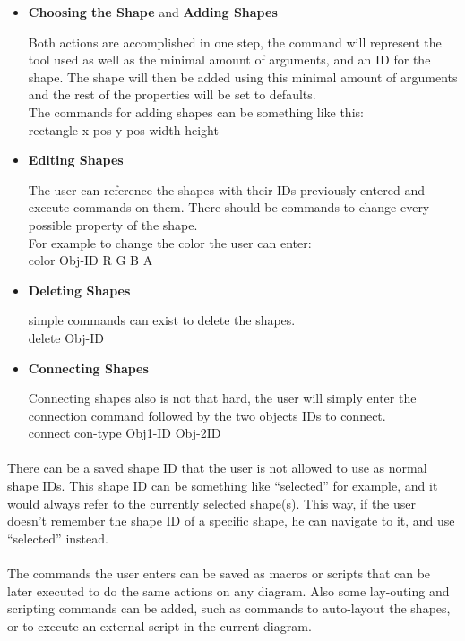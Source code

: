 \begin{itemize}
\item {{\bf Choosing the Shape} and {\bf Adding Shapes}}
\par \noindent
Both actions are accomplished in one step, the command will represent the tool used as well as the minimal amount of arguments, and an ID for the shape. The shape will then be added using this minimal amount of arguments and the rest of the properties will be set to defaults.\\
The commands for adding shapes can be something like this:\\
rectangle x-pos y-pos width height

\item {\bf Editing Shapes}
\par \noindent
The user can reference the shapes with their IDs previously entered and execute commands on them. There should be commands to change every possible property of the shape.\\
For example to change the color the user can enter:\\
color Obj-ID R G B A

\item {\bf Deleting Shapes}
\par \noindent
simple commands can exist to delete the shapes.\\
delete Obj-ID

\item {\bf Connecting Shapes}
\par \noindent
Connecting shapes also is not that hard, the user will simply enter the connection command followed by the two objects IDs to connect.\\
connect con-type Obj1-ID Obj-2ID

\end{itemize}

\paragraph{}
There can be a saved shape ID that the user is not allowed to use as normal shape IDs. This shape ID can be something like ``selected'' for example, and it would always refer to the currently selected shape(s). This way, if the user doesn't remember the shape ID of a specific shape, he can navigate to it, and use ``selected'' instead.

\paragraph{}
The commands the user enters can be saved as macros or scripts that can be later executed to do the same actions on any diagram. Also some lay-outing and scripting commands can be added, such as commands to auto-layout the shapes, or to execute an external script in the current diagram.

